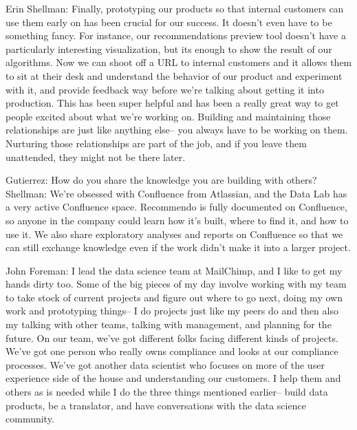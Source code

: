 Erin Shellman: Finally, prototyping our products so that internal
customers can use them early on has been crucial for
our success. It doesn't even have to be something
fancy. For instance, our recommendations preview
tool doesn't have a particularly interesting
visualization, but its enough to show the result of our
algorithms. Now we can shoot off a URL to internal
customers and it allows them to sit at their desk and
understand the behavior of our product and
experiment with it, and provide feedback way before
we're talking about getting it into production. This
has been super helpful and has been a really great
way to get people excited about what we're working
on. Building and maintaining those relationships are
just like anything else-- you always have to be
working on them. Nurturing those relationships are
part of the job, and if you leave them unattended,
they might not be there later.

Gutierrez: How do you share the knowledge you are
building with others?
Shellman: We’re obsessed with Conﬂuence from
Atlassian, and the Data Lab has a very active
Conﬂuence space. Recommendo is fully documented
on Conﬂuence, so anyone in the company could learn
how it’s built, where to ﬁnd it, and how to use it. We
also share exploratory analyses and reports on
Conﬂuence so that we can still exchange knowledge
even if the work didn’t make it into a larger project.

John Foreman: I lead the data science team at
MailChimp, and I like to get my hands dirty too.
Some of the big pieces of my day involve working
with my team to take stock of current projects and
figure out where to go next, doing my own work and
prototyping things-- I do projects just like my peers
do and then also my talking with other teams,
talking with management, and planning for the
future.
On our team, we’ve got different folks facing different
kinds of projects. We’ve got one person who really
owns compliance and looks at our compliance
processes. We’ve got another data scientist who
focuses on more of the user experience side of the
house and understanding our customers. I help them
and others as is needed while I do the three things
mentioned earlier-- build data products, be a
translator, and have conversations with the data
science community.

